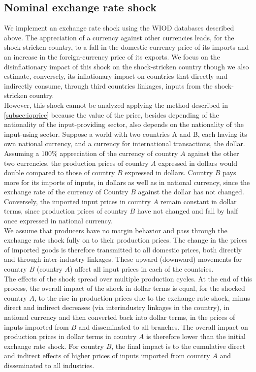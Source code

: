 \documentclass[11pt,a4paper]{article}
\begin{document}
\subsection{Nominal exchange rate shock}
\label{subsec:chocchange}

We implement an exchange rate shock using the WIOD databases described above. 
The appreciation of a currency against other currencies leads, for the shock-stricken country, to a fall in the domestic-currency price of its imports and an increase in the foreign-currency price of its exports. We focus on the disinflationary impact of this shock on the shock-stricken country though we also estimate, conversely, its inflationary impact on countries that directly and indirectly consume, through third countries linkages, inputs from the shock-stricken country.\\
However, this shock cannot be analyzed applying the method described in \ref{subsec:ioprice} because the value of the price, besides depending of the nationality of the input-providing sector, also depends on the nationality of the input-using sector.  Suppose a world with two countries A and B, each having its own national currency, and a currency for international transactions, the dollar.
Assuming a 100$\%$ appreciation of the currency of country $A$ against the other two currencies, the production prices of country $A$ expressed in dollars would double compared to those of country $B$ expressed in dollars. Country $B$ pays more for its imports of inputs, in dollars as well as in national currency, since the exchange rate of the currency of Country $B$ against the dollar has not changed. Conversely, the imported input prices in country $A$ remain constant in dollar terms, since production prices of country $B$ have not changed and fall by half once expressed in national currency.\\
We assume that producers have no margin behavior and pass through the exchange rate shock fully on to their production prices. The change in the prices of imported goods is therefore transmitted to all domestic prices, both directly and through inter-industry linkages. These upward (downward) movements for country $B$ (country $A$) affect all input prices in each of the countries.\\
The effects of the shock spread over multiple production cycles. At the end of this process, the overall impact of the shock in dollar terms is equal, for the shocked country $A$, to the rise in production prices due to the exchange rate shock, minus direct and indirect decreases (via interindustry linkages in the country), in national currency and then converted back into dollar terms, in the prices of inputs imported from $B$ and disseminated to all branches. The overall impact on production prices in dollar terms in country $A$ is therefore lower than the initial exchange rate shock. For country $B$, the final impact is to the cumulative direct and indirect effects of higher prices of inputs imported from country $A$ and disseminated to all industries.\\
\end{document}
